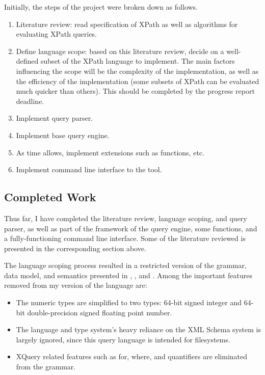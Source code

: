 \documentclass{scrartcl}
\begin{document}
Initially, the steps of the project were broken down as follows.

\begin{enumerate}
\item Literature review: read specification of XPath as well as algorithms for
  evaluating XPath queries.
\item Define language scope: based on this literature review, decide on a
  well-defined subset of the XPath language to implement. The main factors
  influencing the scope will be the complexity of the implementation, as well as
  the efficiency of the implementation (some subsets of XPath can be evaluated
  much quicker than others). This should be completed by the progress report
  deadline.
\item Implement query parser.
\item Implement base query engine.
\item As time allows, implement extensions such as functions, etc.
\item Implement command line interface to the tool.
\end{enumerate}

\subsection{Completed Work}

Thus far, I have completed the literature review, language scoping, and query
parser, as well as part of the framework of the query engine, some functions,
and a fully-functioning command line interface. Some of the literature reviewed
is presented in the corresponding section above.

The language scoping process resulted in a restricted version of the grammar,
data model, and semantics presented in \cite{xpath}, \cite{xpath-datamodel}, and
\cite{xpath-semantics}. Among the important features removed from my version of
the language are:

\begin{itemize}
\item The numeric types are simplified to two types: 64-bit signed integer and
  64-bit double-precision signed floating point number.
\item The language and type system's heavy reliance on the XML Schema system is
  largely ignored, since this query language is intended for filesystems.
\item XQuery related features such as for, where, and quantifiers are eliminated
  from the grammar.
\end{itemize}
\end{document}
